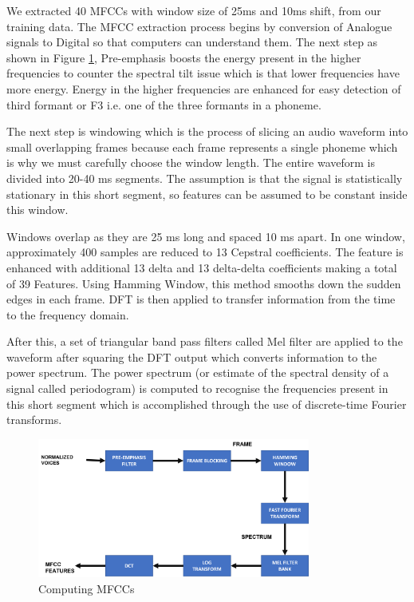 \documentclass[3p,times]{elsarticle}
\begin{document}
We extracted 40 MFCCs with  window size of 25ms and 10ms shift, from our training data. The MFCC extraction process begins by conversion of Analogue signals to Digital so that computers can understand them. The next step as shown in Figure \ref{fig:MFCCs-computation}, Pre-emphasis boosts the energy present in the higher frequencies to counter the spectral tilt issue which is that lower frequencies have more energy. Energy in the higher frequencies are enhanced for easy detection of third formant or F3 i.e. one of the three formants in a phoneme. 

The next step is windowing which is the process of slicing an audio waveform into small overlapping frames because each frame represents a single phoneme which is why we must carefully choose the window length. The entire waveform is divided into 20-40 ms segments. The assumption is that the signal is statistically stationary in this short segment, so features can be assumed to be constant inside this window. %

Windows overlap as they are 25 ms long and spaced 10 ms apart. In one window, approximately 400 samples are reduced to 13 Cepstral coefficients. The feature is enhanced with additional 13 delta and 13 delta-delta coefficients making a total of 39 Features. Using Hamming Window, this method smooths down the sudden edges in each frame. DFT is then applied to transfer information from the time to the frequency domain. 

After this, a set of triangular band pass filters called Mel filter are applied to the waveform after squaring the DFT output which converts information to the power spectrum. The power spectrum (or estimate of the spectral density of a signal called periodogram) is computed to recognise the frequencies present in this short segment which is accomplished through the use of discrete-time Fourier transforms.   

\begin{figure}[h]
    \centering
    \includegraphics[width=0.8\textwidth]{img/feature extraction.png}
    \caption{Computing MFCCs}
    \label{fig:MFCCs-computation}
\end{figure}
\end{document}
